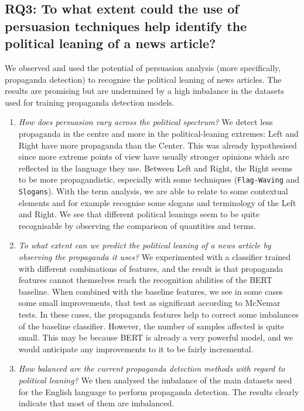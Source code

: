 \subsection*{RQ3: To what extent could the use of persuasion techniques help identify the political leaning of a news article?}

We observed and used the potential of persuasion analysis (more specifically, propaganda detection) to recognise the political leaning of news articles. The results are promising but are undermined by a high imbalance in the datasets used for training propaganda detection models.

\begin{enumerate}[label={\textbf{RQ3.\arabic*:}},leftmargin=2cm]
    \item \emph{How does persuasion vary across the political spectrum?} We detect less propaganda in the centre and more in the political-leaning extremes: %
          Left and Right have more propaganda than the Center.
          This was already hypothesised since more extreme points of view have usually stronger opinions which are reflected in the language they use. Between Left and Right, the Right seems to be more propagandistic, especially with some techniques (\texttt{Flag-Waving} and \texttt{Slogans}). With the term analysis, we are able to relate to some contextual elements and for example recognise some slogans and terminology of the Left and Right. We see that different political leanings seem to be quite recognisable by observing the comparison of quantities and terms.
    \item \emph{To what extent can we predict the political leaning of a news article by observing the propaganda it uses?} We experimented with a classifier trained with different combinations of features, and the result is that propaganda features cannot themselves reach the recognition abilities of the BERT baseline. When combined with the baseline features, we see in some cases some small improvements, that test as significant according to McNemar tests. In these cases, the propaganda features help to correct some imbalances of the baseline classifier. However, the number of samples affected is quite small. This may be because BERT is already a very powerful model, and we would anticipate any improvements to it to be fairly incremental.
    \item \emph{How balanced are the current propaganda detection methods with regard to political leaning?} We then analysed the imbalance of the main datasets used for the English language to perform propaganda detection. The results clearly indicate that most of them are imbalanced.

\end{enumerate}
